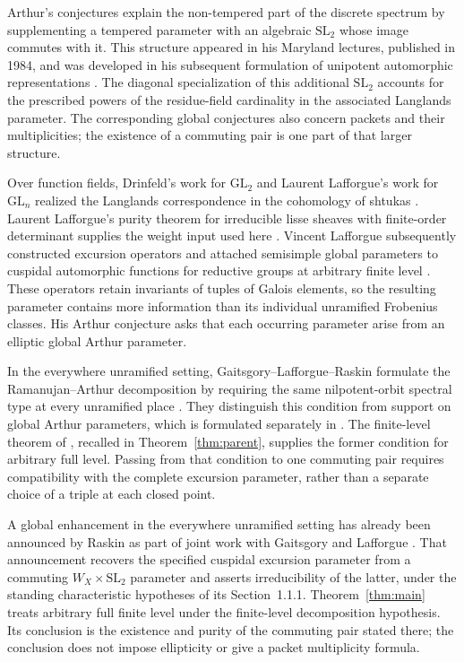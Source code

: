 \documentclass[11pt]{article}
\numberwithin{equation}{section}
\theoremstyle{definition}
\theoremstyle{remark}
\begin{document}
Arthur's conjectures explain the non-tempered part of the discrete
spectrum by supplementing a tempered parameter with an algebraic
$\mathrm{SL}_2$ whose image commutes with it.  This structure appeared
in his Maryland lectures, published in 1984, and was developed in his
subsequent formulation of unipotent automorphic representations
\cite[Sections~1.3 and~2.1]{history:Arthur1984}
\cite[Section~8]{history:Arthur1989}.
The diagonal specialization of this additional $\mathrm{SL}_2$
accounts for the prescribed powers of the residue-field cardinality
in the associated Langlands parameter.  The corresponding global
conjectures also concern packets and their multiplicities; the
existence of a commuting pair is one part of that larger structure.

Over function fields, Drinfeld's work for $\mathrm{GL}_2$ and
Laurent Lafforgue's work for $\mathrm{GL}_n$ realized the Langlands
correspondence in the cohomology of shtukas
\cite{history:Drinfeld1980,history:LLafforgue}.
Laurent Lafforgue's purity theorem for irreducible lisse sheaves with
finite-order determinant supplies the weight input used here
\cite[Theorem~VII.6]{history:LLafforgue}.
Vincent Lafforgue subsequently constructed excursion operators and
attached semisimple global parameters to cuspidal automorphic
functions for reductive groups at arbitrary finite level
\cite[Theorems~0.1 and~11.11]{Hist:VLafforgue}.
These operators retain invariants of tuples of Galois elements,
so the resulting parameter contains more information than its
individual unramified Frobenius classes.  His Arthur conjecture
\cite[Section~12.2.2 and Conjecture~12.7]{Hist:VLafforgue}
asks that each occurring parameter arise from an elliptic global
Arthur parameter.

In the everywhere unramified setting, Gaitsgory--Lafforgue--Raskin
formulate the Ramanujan--Arthur
decomposition by requiring the same nilpotent-orbit spectral type
at every unramified place
\cite[Section~3.4.3, Conjectures~3.4.5--3.4.6, and Remark~3.4.7]{history:GLR}.
They distinguish this condition from support on global Arthur
parameters, which is formulated separately in
\cite[Section~3.6]{history:GLR}.
The finite-level theorem of \cite[Theorem~1.1]{Parent}, recalled
in Theorem~\ref{thm:parent}, supplies the former condition for
arbitrary full level.  Passing from that condition to one commuting
pair requires compatibility with the complete excursion parameter,
rather than a separate choice of a triple at each closed point.

A global enhancement in the everywhere unramified setting has
already been announced by Raskin as part of joint work with
Gaitsgory and Lafforgue
\cite[Theorem~C]{history:RaskinAnnouncement}.
That announcement recovers the specified cuspidal excursion
parameter from a commuting $W_X\times\mathrm{SL}_2$ parameter
and asserts irreducibility of the latter, under the standing
characteristic hypotheses of its Section~1.1.1.
Theorem~\ref{thm:main} treats arbitrary full finite level under
the finite-level decomposition hypothesis.  Its conclusion is
the existence and purity of the commuting pair stated there;
the conclusion does not impose ellipticity or give a packet
multiplicity formula.
\end{document}
